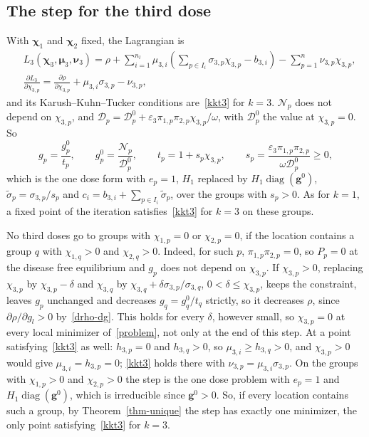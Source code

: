 \documentclass[11pt]{article}
\theoremstyle{plain}
\theoremstyle{remark}
\numberwithin{equation}{section}
\begin{document}
\subsection{The step for the third dose}\label{sec-step3}
With $\bm\chi_1$ and $\bm\chi_2$ fixed, the Lagrangian is
\begin{equation}\label{lagrangian3}
\begin{aligned}
&L_3(\bm\chi_3,\bm\mu_3,\bm\nu_3)=\rho
+\sum_{i=1}^{n_l}\mu_{3,i}\left(\sum_{p\in I_i}\sigma_{3,p}\chi_{3,p}-b_{3,i}\right)
-\sum_{p=1}^n\nu_{3,p}\chi_{3,p},\\
&\frac{\partial L_3}{\partial\chi_{3,p}}=\frac{\partial\rho}{\partial\chi_{3,p}}
+\mu_{3,i}\sigma_{3,p}-\nu_{3,p},
\end{aligned}
\end{equation}
and its Karush--Kuhn--Tucker conditions are~\eqref{kkt3} for $k=3$.
$\mathcal{N}_p$ does not depend on $\chi_{3,p}$,
and $\mathcal{D}_p=\mathcal{D}_p^0+\varepsilon_3\pi_{1,p}\pi_{2,p}\chi_{3,p}/\omega$,
with $\mathcal{D}_p^0$ the value at $\chi_{3,p}=0$. So
\begin{equation*}
g_p=\frac{g_p^0}{t_p},\qquad g_p^0=\frac{\mathcal{N}_p}{\mathcal{D}_p^0},\qquad
t_p=1+s_p\chi_{3,p},\qquad s_p=\frac{\varepsilon_3\pi_{1,p}\pi_{2,p}}{\omega\mathcal{D}_p^0}\ge 0,
\end{equation*}
which is the one dose form with $e_p=1$, $H_1$ replaced by
$H_1\operatorname{diag}(\bm g^0)$, $\widetilde\sigma_p=\sigma_{3,p}/s_p$ and
$c_i=b_{3,i}+\sum_{p\in I_i}\widetilde\sigma_p$, over the groups with $s_p>0$.
As for $k=1$, a fixed point of the iteration satisfies~\eqref{kkt3} for $k=3$
on these groups.

No third doses go to groups with $\chi_{1,p}=0$ or $\chi_{2,p}=0$, if the
location contains a group $q$ with $\chi_{1,q}>0$ and $\chi_{2,q}>0$. Indeed,
for such $p$, $\pi_{1,p}\pi_{2,p}=0$, so $P_p=0$ at the disease free
equilibrium and $g_p$ does not depend on $\chi_{3,p}$. If $\chi_{3,p}>0$,
replacing $\chi_{3,p}$ by $\chi_{3,p}-\delta$ and $\chi_{3,q}$ by
$\chi_{3,q}+\delta\sigma_{3,p}/\sigma_{3,q}$, $0<\delta\le\chi_{3,p}$, keeps the
constraint, leaves $g_p$ unchanged and decreases $g_q=g_q^0/t_q$ strictly, so
it decreases $\rho$, since $\partial\rho/\partial g_l>0$ by~\eqref{drho-dg}.
This holds for every $\delta$, however small, so $\chi_{3,p}=0$ at every
local minimizer of~\eqref{problem}, not only at the end of this step. At a
point satisfying~\eqref{kkt3} as well: $h_{3,p}=0$ and $h_{3,q}>0$, so
$\mu_{3,i}\ge h_{3,q}>0$, and $\chi_{3,p}>0$ would give $\mu_{3,i}=h_{3,p}=0$;
\eqref{kkt3} holds there with $\nu_{3,p}=\mu_{3,i}\sigma_{3,p}$. On the groups
with $\chi_{1,p}>0$ and $\chi_{2,p}>0$ the step is the one dose problem with
$e_p=1$ and $H_1\operatorname{diag}(\bm g^0)$, which is irreducible since
$\bm g^0>0$. So, if every location contains such a group, by
Theorem~\ref{thm-unique} the step has exactly one minimizer, the only point
satisfying~\eqref{kkt3} for $k=3$.
\end{document}
